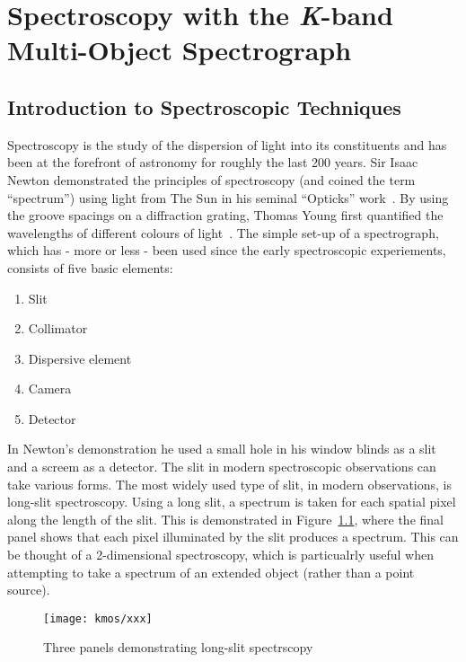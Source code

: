 \chapter{Spectroscopy with the {\it K}-band Multi-Object Spectrograph}

\section{Introduction to Spectroscopic Techniques} %
\label{sec:introduction_to_spectroscopic_techniques}

Spectroscopy is the study of the dispersion of light into its constituents and has been at the forefront of astronomy for roughly the last 200 years.
Sir Isaac Newton demonstrated the principles of spectroscopy (and coined the term ``spectrum'') using light from The Sun in his seminal ``Opticks'' work~\citep{Newton16xx}.
By using the groove spacings on a diffraction grating, Thomas Young first quantified the wavelengths of different colours of light~\citep{Young1801}.
The simple set-up of a spectrograph, which has - more or less - been used since the early spectroscopic experiements, consists of five basic elements:

\begin{enumerate}
    \item Slit
    \item Collimator
    \item Dispersive element
    \item Camera
    \item Detector
\end{enumerate}

In Newton's demonstration he used a small hole in his window blinds as a slit and a screem as a detector.
The slit in modern spectroscopic observations can take various forms.
The most widely used type of slit, in modern observations, is long-slit spectroscopy.
Using a long slit, a spectrum is taken for each spatial pixel along the length of the slit.
This is demonstrated in Figure~\ref{fig:long-slit}, where the final panel shows that each pixel illuminated by the slit produces a spectrum.
This can be thought of a 2-dimensional spectroscopy, which is particualrly useful when attempting to take a spectrum of an extended object
(rather than a point source).

\begin{figure}
 \centering
 \texttt{[image: kmos/xxx]}
 \caption[Long-slit Spectrscopy]{Three panels demonstrating long-slit spectrscopy
 \label{fig:long-slit}}
\end{figure}


